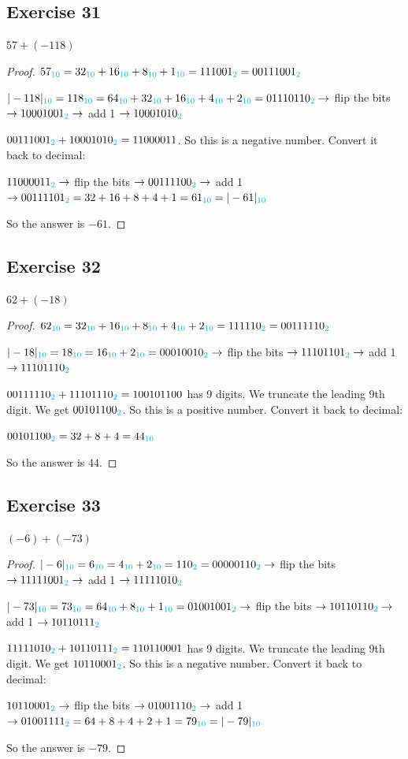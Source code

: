 \documentclass[14pt]{extarticle}
\newcommand{\base}[1]{{\color{cyan}#1}} \newcommand{\da}{\downarrow}
\begin{document}
\subsection{Exercise 31} $57 + (-118)$
\begin{proof} $57_\base{10} = 32_\base{10} + 16_\base{10} + 8_\base{10} +
1_\base{10} = 111001_\base{2} = 00111001_\base{2}$

$|-118|_\base{10} = 118_\base{10} = 64_\base{10} + 32_\base{10} + 16_\base{10} +
4_\base{10} + 2_\base{10} = 01110110_\base{2} \to$ flip the bits $\to
10001001_\base{2} \to$ add 1 $\to 10001010_\base{2}$

$00111001_\base{2} + 10001010_\base{2} = 1100 0011$. So this is a negative
number. Convert it back to decimal:

$11000011_\base{2} \to$ flip the bits $\to 00111100_\base{2} \to$ add 1 $\to
00111101_\base{2} = 32 + 16 + 8 + 4 + 1 = 61_\base{10} = |-61|_\base{10}$

So the answer is $-61$. \end{proof}
\subsection{Exercise 32} $62 + (-18)$
\begin{proof} $62_\base{10} = 32_\base{10} + 16_\base{10} + 8_\base{10} +
4_\base{10} + 2_\base{10} = 111110_\base{2} = 00111110_\base{2}$

$|-18|_\base{10} = 18_\base{10} = 16_\base{10} + 2_\base{10} = 00010010_\base{2}
\to$ flip the bits $\to 11101101_\base{2} \to$ add 1 $\to 11101110_\base{2}$

$00111110_\base{2} + 11101110_\base{2} = 1 0010 1100$ has 9 digits. We truncate
the leading 9th digit. We get $00101100_\base{2}$. So this is a positive number.
Convert it back to decimal:

$00101100_\base{2} = 32 + 8 + 4 = 44_\base{10}$

So the answer is $44$. \end{proof}
\subsection{Exercise 33} $(-6) + (-73)$
\begin{proof} $|-6|_\base{10} = 6_\base{10} = 4_\base{10} + 2_\base{10} =
110_\base{2} = 00000110_\base{2} \to$ flip the bits $\to 11111001_\base{2} \to$
add 1 $\to 11111010_\base{2}$

$|-73|_\base{10} = 73_\base{10} = 64_\base{10} + 8_\base{10} + 1_\base{10} =
01001001_\base{2} \to$ flip the bits $\to 10110110_\base{2} \to$ add 1 $\to
10110111_\base{2}$

$11111010_\base{2} + 10110111_\base{2} = 1 1011 0001$ has 9 digits. We truncate
the leading 9th digit. We get $10110001_\base{2}$. So this is a negative number.
Convert it back to decimal:

$10110001_\base{2} \to$ flip the bits $\to 01001110_\base{2} \to$ add 1 $\to
01001111_\base{2} = 64 + 8 + 4 + 2 + 1 = 79_\base{10} = |-79|_\base{10}$

So the answer is $-79$. \end{proof}
\end{document}
